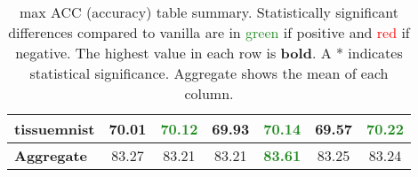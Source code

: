 \documentclass{article}
\begin{document}
\begin{table}[h]
{\begin{tabular}{l|cccccc}
            tissuemnist & 70.01 & \textcolor{ForestGreen}{70.12} & 69.93 & \textcolor{ForestGreen}{70.14} & 69.57 & \textbf{\textcolor{ForestGreen}{70.22}} \\ \hline
            \textbf{Aggregate} & 83.27 & 83.21 & 83.21 & \textbf{\textcolor{ForestGreen}{83.61}} & 83.25 & 83.24 \\ \hline
        \end{tabular}
    }
    \caption{max ACC (accuracy) table summary. Statistically significant differences compared to vanilla are in \textcolor{ForestGreen}{green} if positive and \textcolor{red}{red} if negative. The highest value in each row is \textbf{bold}. A * indicates statistical significance. Aggregate shows the mean of each column.}
    \label{tab:results3}
\end{table}
\end{document}
